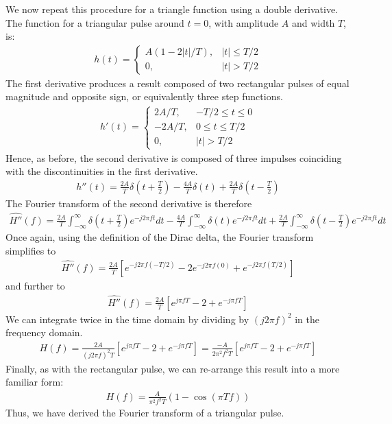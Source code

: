 \documentclass[a4paper, 11pt]{article}
\begin{document}
\newpage

We now repeat this procedure for a triangle function using a double derivative.
The function for a triangular pulse around $t=0$, with amplitude $A$ and width $T$, is:
\begin{align*}
    h(t) = \begin{cases}
        A(1 - 2|t|/T), & |t| \leq T/2 \\
        0,             & |t| > T/2
    \end{cases}
\end{align*}
The first derivative produces a result composed of two rectangular pulses of
equal magnitude and opposite sign, or equivalently three step functions.
\begin{align*}
    h'(t) = \begin{cases}
        2A/T, & -T/2 \leq t \leq 0 \\
       -2A/T, &  0 \leq t \leq T/2 \\
        0,    & |t| > T/2
    \end{cases}
\end{align*}
Hence, as before, the second derivative is composed of three impulses coinciding
with the discontinuities in the first derivative.
\begin{align*}
    h''(t) = \frac{2A}{T}\delta(t+\frac{T}{2}) -
             \frac{4A}{T}\delta(t) +
             \frac{2A}{T}\delta(t-\frac{T}{2})
\end{align*}
The Fourier transform of the second derivative is therefore
\begin{align*}
    \widehat{H''}(f) = \frac{2A}{T}\int_{-\infty}^\infty \delta(t+\frac{T}{2}) e^{-j2\pi ft} dt -
             \frac{4A}{T}\int_{-\infty}^\infty \delta(t) e^{-j2\pi ft} dt +
             \frac{2A}{T}\int_{-\infty}^\infty \delta(t-\frac{T}{2}) e^{-j2\pi ft} dt
\end{align*}
Once again, using the definition of the Dirac delta, the Fourier transform
simplifies to
\begin{align*}
    \widehat{H''}(f) = \frac{2A}{T} \left[ e^{-j2\pi f(-T/2)} - 2e^{-j2\pi f(0)} + e^{-j2\pi f(T/2)} \right]
\end{align*}
and further to
\begin{align*}
    \widehat{H''}(f) = \frac{2A}{T} \left[ e^{j\pi fT} - 2 + e^{-j\pi fT} \right]
\end{align*}
We can integrate twice in the time domain by dividing by $(j2\pi f)^2$ in the frequency
domain.
\begin{align*}
    H(f) = \frac{2A}{(j2\pi f)^2 T} \left[ e^{j\pi fT} - 2 + e^{-j\pi fT} \right]
         = \frac{-A}{2\pi^2f^2 T} \left[ e^{j\pi fT} - 2 + e^{-j\pi fT} \right]
\end{align*}
Finally, as with the rectangular pulse, we can re-arrange this result into a
more familiar form:
\begin{align*}
    H(f) = \frac{A}{\pi^2f^2T}(1 - \cos(\pi Tf))
\end{align*}
Thus, we have derived the Fourier transform of a triangular pulse.
\end{document}
